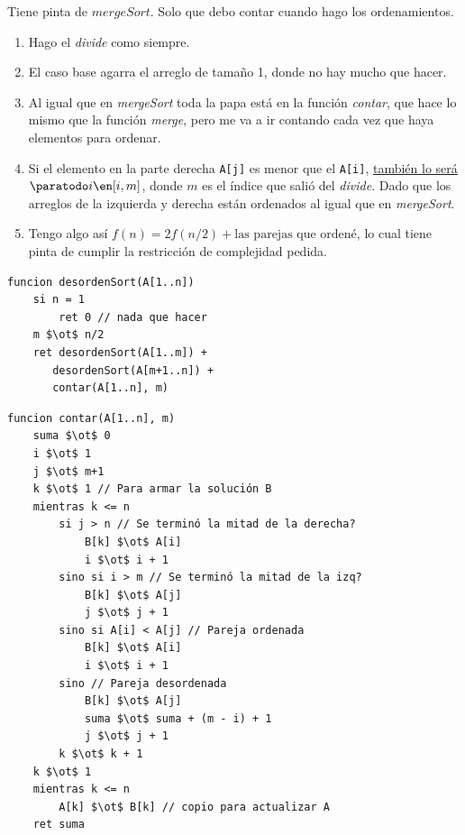 Tiene pinta de $\textit{mergeSort}$. Solo que debo contar cuando hago los ordenamientos.
\begin{enumerate}[label=\footnotesize\purple{\faIcon{code}$_{\arabic*)}$}]
  \item Hago el \textit{divide} como siempre.
  \item El caso base agarra el arreglo de tamaño 1, donde no hay mucho que hacer.
  \item Al igual que en \textit{mergeSort} toda la papa está en la función \textit{contar},
        que hace lo mismo que la función \textit{merge}, pero me va a ir contando cada vez que haya elementos
        para ordenar.
  \item Si el elemento en la parte derecha \texttt{A[j]} es menor que el \texttt{A[i]}, \underline{también lo será} $\paratodo i \en [i,m]$,
        donde $m$ es el índice que salió del \textit{divide}. Dado que los arreglos de la izquierda y derecha están ordenados al igual que
        en \textit{mergeSort}.
  \item Tengo algo así \ul{$f(n) = 2f(n/2) + \text{las parejas que ordené}$}, lo cual tiene pinta de cumplir la restricción de complejidad pedida.
\end{enumerate}
  \begin{tcolorbox}
    \begin{lstlisting}
funcion desordenSort(A[1..n])
    si n = 1
        ret 0 // nada que hacer
    m $\ot$ n/2
    ret desordenSort(A[1..m]) +
       desordenSort(A[m+1..n]) +
       contar(A[1..n], m)\end{lstlisting}
  \end{tcolorbox}
  \begin{tcolorbox}
    \begin{lstlisting}
funcion contar(A[1..n], m)
    suma $\ot$ 0
    i $\ot$ 1
    j $\ot$ m+1
    k $\ot$ 1 // Para armar la solución B
    mientras k <= n
        si j > n // Se terminó la mitad de la derecha?
            B[k] $\ot$ A[i]
            i $\ot$ i + 1
        sino si i > m // Se terminó la mitad de la izq?
            B[k] $\ot$ A[j]
            j $\ot$ j + 1
        sino si A[i] < A[j] // Pareja ordenada
            B[k] $\ot$ A[i]
            i $\ot$ i + 1
        sino // Pareja desordenada
            B[k] $\ot$ A[j]
            suma $\ot$ suma + (m - i) + 1
            j $\ot$ j + 1
        k $\ot$ k + 1
    k $\ot$ 1
    mientras k <= n
        A[k] $\ot$ B[k] // copio para actualizar A
    ret suma \end{lstlisting}
  \end{tcolorbox}

